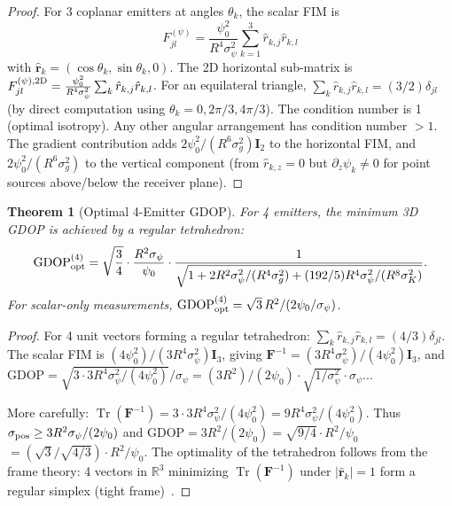 \documentclass[twocolumn,superscriptaddress,prd,nofootinbib]{revtex4-2}
\newcommand{\GDOP}{\mathrm{GDOP}}
\newcommand{\FIM}{\mathbf{F}}
\newcommand{\rvec}{\mathbf{r}}
\DeclareMathOperator{\Tr}{Tr}
\newtheorem{theorem}{Theorem}
\begin{document}
\begin{proof}
For 3 coplanar emitters at angles $\theta_k$, the scalar FIM is
\begin{equation}
F_{jl}^{(\psi)} = \frac{\psi_0^2}{R^4\sigma_\psi^2}\sum_{k=1}^3
\hat{r}_{k,j}\hat{r}_{k,l}
\end{equation}
with $\hat{\rvec}_k = (\cos\theta_k, \sin\theta_k, 0)$.
The 2D horizontal sub-matrix is
$F_{jl}^{(\psi),\rm 2D} = \frac{\psi_0^2}{R^4\sigma_\psi^2}
\sum_k \hat{r}_{k,j}\hat{r}_{k,l}$.
For an equilateral triangle, $\sum_k \hat{r}_{k,j}\hat{r}_{k,l}
= (3/2)\delta_{jl}$ (by direct computation using
$\theta_k = 0, 2\pi/3, 4\pi/3$). The condition number is 1 (optimal
isotropy). Any other angular arrangement has condition number $> 1$.
The gradient contribution adds $2\psi_0^2/(R^6\sigma_g^2)\mathbf{I}_2$
to the horizontal FIM, and $2\psi_0^2/(R^6\sigma_g^2)$ to the vertical
component (from $\hat{r}_{k,z} = 0$ but
$\partial_z\psi_k \neq 0$ for point sources above/below the receiver plane).
\end{proof}

\begin{theorem}[Optimal 4-Emitter GDOP]\label{thm:4emit}
For 4 emitters, the minimum 3D GDOP is achieved by a regular
tetrahedron:
\begin{equation}
\GDOP_{\rm opt}^{(4)} = \sqrt{\frac{3}{4}}\cdot\frac{R^2\sigma_\psi}{\psi_0}
\cdot\frac{1}{\sqrt{1 + 2R^2\sigma_\psi^2/(R^4\sigma_g^2)
+ (192/5)R^4\sigma_\psi^2/(R^8\sigma_K^2)}}.
\label{eq:gdop-4}
\end{equation}
For scalar-only measurements, $\GDOP_{\rm opt}^{(4)} = \sqrt{3}\,R^2/(2\psi_0/\sigma_\psi)$.
\end{theorem}

\begin{proof}
For 4 unit vectors forming a regular tetrahedron:
$\sum_k \hat{r}_{k,j}\hat{r}_{k,l} = (4/3)\delta_{jl}$.
The scalar FIM is $(4\psi_0^2)/(3R^4\sigma_\psi^2)\mathbf{I}_3$, giving
$\FIM^{-1} = (3R^4\sigma_\psi^2)/(4\psi_0^2)\mathbf{I}_3$, and
$\GDOP = \sqrt{3\cdot 3R^4\sigma_\psi^2/(4\psi_0^2)}/\sigma_\psi
= (3R^2)/(2\psi_0)\cdot\sqrt{1/\sigma_\psi^2}\cdot\sigma_\psi$...

More carefully: $\Tr(\FIM^{-1}) = 3\cdot 3R^4\sigma_\psi^2/(4\psi_0^2)
= 9R^4\sigma_\psi^2/(4\psi_0^2)$.
Thus $\sigma_{\rm pos} \geq 3R^2\sigma_\psi/(2\psi_0)$
and $\GDOP = 3R^2/(2\psi_0) = \sqrt{9/4}\cdot R^2/\psi_0$
$= (\sqrt{3}/\sqrt{4/3})\cdot R^2/\psi_0$. The optimality of the
tetrahedron follows from the frame theory: 4 vectors in $\mathbb{R}^3$
minimizing $\Tr(\FIM^{-1})$ under $|\hat{\rvec}_k| = 1$ form a
regular simplex (tight frame)~\cite{Casazza2012FrameTheory}.
\end{proof}
\end{document}
